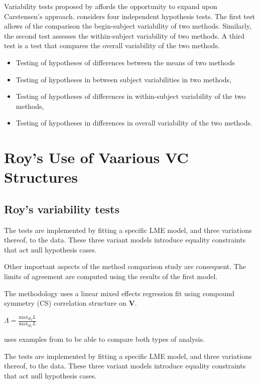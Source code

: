 \documentclass[12pt, a4paper]{report}
\theoremstyle{plain}
\theoremstyle{definition}
\theoremstyle{remark}
\begin{document}
	
	Variability tests proposed by \citet{ARoy2009} affords the opportunity to expand upon Carstensen's approach. \citet{ARoy2009} considers four independent hypothesis tests. The first test allows of the comparison the begin-subject variability of two methods. Similarly, the second test assesses the within-subject variability of two methods. A third test is a test that compares the overall variability of the two methods.
	\begin{itemize}
		\item Testing of hypotheses of differences between the means of
		two methods\item Testing of hypotheses in between subject
		variabilities in two methods, \item Testing of hypotheses of
		differences in within-subject variability of the two methods,
		\item Testing of hypotheses in differences in overall variability
		of the two methods.
	\end{itemize}
		

	

	\section{Roy's Use of Vaarious VC Structures}
	\subsection{Roy's variability tests}
	
	
	The tests are implemented by fitting a specific LME model, and three variations thereof, to the data. These three variant models introduce equality constraints that act null hypothesis cases.
	
	Other important aspects of the method comparison study are consequent. The limits of agreement are computed using the results of the first model.
	
	
	
	
	The methodology uses a linear mixed effects regression fit using
	compound symmetry (CS) correlation structure on \textbf{V}.
	
	
	$\Lambda = \frac{\mbox{max}_{H_{0}}L}{\mbox{max}_{H_{1}}L}$
	
	
	
	\citet{ARoy2009} uses examples from \citet{BA86} to be able to
	compare both types of analysis.
	
	
	The tests are implemented by fitting a specific LME model, and three variations thereof, to the data. These three variant models introduce equality constraints that act null hypothesis cases.
	
\end{document}
